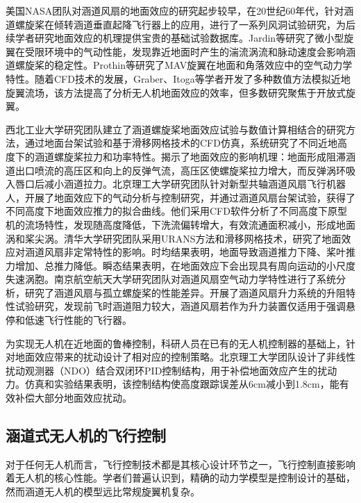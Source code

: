 美国NASA团队对涵道风扇的地面效应的研究起步较早，在20世纪60年代，针对涵道螺旋桨在倾转涵道垂直起降飞行器上的应用，进行了一系列风洞试验研究，为后续学者研究地面效应的机理提供宝贵的基础试验数据库\cite{yaggy1961aerodynamics}\cite{yaggy1961wind}。Jardin等研究了微小型旋翼在受限环境中的气动性能，发现靠近地面时产生的湍流涡流和脉动速度会影响涵道螺旋桨的稳定性\cite{jardin2017aerodynamic}。Prothin等研究了MAV旋翼在地面和角落效应中的空气动力学特性\cite{prothin2019aerodynamics}。随着CFD技术的发展，Graber、Itoga等学者开发了多种数值方法模拟近地旋翼流场，该方法提高了分析无人机地面效应的效率，但多数研究聚焦于开放式旋翼\cite{graber1990investigation}。

西北工业大学研究团队建立了涵道螺旋桨地面效应试验与数值计算相结合的研究方法，通过地面台架试验和基于滑移网格技术的CFD仿真，系统研究了不同近地高度下的涵道螺旋桨拉力和功率特性\cite{deng2020ground}。揭示了地面效应的影响机理：地面形成阻滞涵道出口喷流的高压区和向上的反弹气流，高压区使螺旋桨拉力增大，而反弹涡环吸入唇口后减小涵道拉力\cite{Aerodynamic_performance_assessment_of_a_ducted_fan_UAV}。北京理工大学研究团队针对新型共轴涵道风扇飞行机器人，开展了地面效应下的气动分析与控制研究，并通过涵道风扇台架试验，获得了不同高度下地面效应推力的拟合曲线\cite{ai2020aerodynamic}。他们采用CFD软件分析了不同高度下原型机的流场特性，发现随高度降低，下洗流偏转增大，有效流通面积减小，形成地面涡和桨尖涡\cite{fan2022novel}。清华大学研究团队采用URANS方法和滑移网格技术，研究了地面效应对涵道风扇非定常特性的影响。时均结果表明，地面导致涵道推力下降、桨叶推力增加、总推力降低。瞬态结果表明，在地面效应下会出现具有周向运动的小尺度失速涡胞\cite{luo2023numerical}。南京航空航天大学研究团队对涵道风扇空气动力学特性进行了系统分析，研究了涵道风扇与孤立螺旋桨的性能差异\cite{li2005aerodynamic}。开展了涵道风扇升力系统的升阻特性试验研究，发现前飞时涵道阻力较大，涵道风扇若作为升力装置仅适用于强调悬停和低速飞行性能的飞行器\cite{li2004experimental}。

为实现无人机在近地面的鲁棒控制，科研人员在已有的无人机控制器的基础上，针对地面效应带来的扰动设计了相对应的控制策略。北京理工大学团队设计了非线性扰动观测器（NDO）结合双闭环PID控制结构，用于补偿地面效应产生的扰动力。仿真和实验结果表明，该控制结构使高度跟踪误差从6cm减小到1.8cm，能有效补偿大部分地面效应扰动\cite{ai2020aerodynamic}。

\subsection{涵道式无人机的飞行控制}
对于任何无人机而言，飞行控制技术都是其核心设计环节之一，飞行控制直接影响着无人机的核心性能。学者们普遍认识到，精确的动力学模型是控制设计的基础，然而涵道无人机的模型远比常规旋翼机复杂。


